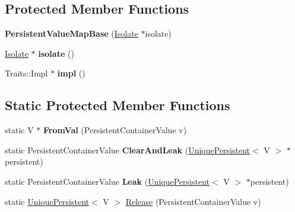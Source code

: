 \subsection*{Protected Member Functions}
\begin{DoxyCompactItemize}
\item 
\hypertarget{classv8_1_1_persistent_value_map_base_a1adee3f8b1ff929f07ddf9e94c6108ed}{}{\bfseries Persistent\+Value\+Map\+Base} (\hyperlink{classv8_1_1_isolate}{Isolate} $\ast$isolate)\label{classv8_1_1_persistent_value_map_base_a1adee3f8b1ff929f07ddf9e94c6108ed}

\item 
\hypertarget{classv8_1_1_persistent_value_map_base_af2e83791955c6027213dd979eebeb8f4}{}\hyperlink{classv8_1_1_isolate}{Isolate} $\ast$ {\bfseries isolate} ()\label{classv8_1_1_persistent_value_map_base_af2e83791955c6027213dd979eebeb8f4}

\item 
\hypertarget{classv8_1_1_persistent_value_map_base_aacd576258fbffaf366436a6ecdd8cdf5}{}Traits\+::\+Impl $\ast$ {\bfseries impl} ()\label{classv8_1_1_persistent_value_map_base_aacd576258fbffaf366436a6ecdd8cdf5}

\end{DoxyCompactItemize}
\subsection*{Static Protected Member Functions}
\begin{DoxyCompactItemize}
\item 
\hypertarget{classv8_1_1_persistent_value_map_base_af8fcd471f2d53ffca9881f7c436044e8}{}static V $\ast$ {\bfseries From\+Val} (Persistent\+Container\+Value v)\label{classv8_1_1_persistent_value_map_base_af8fcd471f2d53ffca9881f7c436044e8}

\item 
\hypertarget{classv8_1_1_persistent_value_map_base_a639f2b3a7f41e389a71792fe9d1aeb7c}{}static Persistent\+Container\+Value {\bfseries Clear\+And\+Leak} (\hyperlink{classv8_1_1_unique_persistent}{Unique\+Persistent}$<$ V $>$ $\ast$persistent)\label{classv8_1_1_persistent_value_map_base_a639f2b3a7f41e389a71792fe9d1aeb7c}

\item 
\hypertarget{classv8_1_1_persistent_value_map_base_ae49c98de990b7239aea9f0c131ed1be3}{}static Persistent\+Container\+Value {\bfseries Leak} (\hyperlink{classv8_1_1_unique_persistent}{Unique\+Persistent}$<$ V $>$ $\ast$persistent)\label{classv8_1_1_persistent_value_map_base_ae49c98de990b7239aea9f0c131ed1be3}

\item 
static \hyperlink{classv8_1_1_unique_persistent}{Unique\+Persistent}$<$ V $>$ \hyperlink{classv8_1_1_persistent_value_map_base_ae4e89289ea520ab3ad6b069ddff77ed5}{Release} (Persistent\+Container\+Value v)
\end{DoxyCompactItemize}


